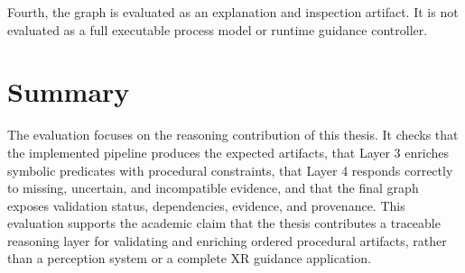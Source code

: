 Fourth, the graph is evaluated as an explanation and inspection artifact. It is not evaluated as a full executable process model or runtime guidance controller.

\section{Summary}
\label{sec:evaluation-summary}

The evaluation focuses on the reasoning contribution of this thesis. It checks that the implemented pipeline produces the expected artifacts, that Layer 3 enriches symbolic predicates with procedural constraints, that Layer 4 responds correctly to missing, uncertain, and incompatible evidence, and that the final graph exposes validation status, dependencies, evidence, and provenance. This evaluation supports the academic claim that the thesis contributes a traceable reasoning layer for validating and enriching ordered procedural artifacts, rather than a perception system or a complete XR guidance application.

